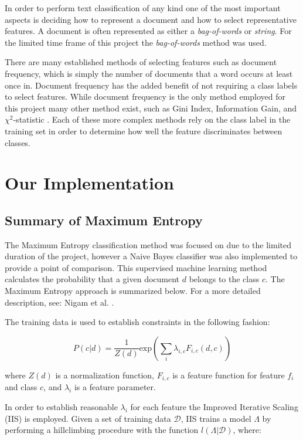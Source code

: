 \documentclass[final,3p,12pt]{elsarticle}
\begin{document}
In order to perform text classification of any kind one of the most important
aspects is deciding how to represent a document and how to select
representative features. A document is often represented as either a
\textit{bag-of-words} or \textit{string}. For the limited time frame of this
project the \textit{bag-of-words} method was used.

There are many established methods of selecting features such as document
frequency, which is simply the number of documents that a word occurs at least
once in. Document frequency has the added benefit of not requiring a class
labels to select features. While document frequency is the only method employed
for this project many other method exist, such as Gini Index, Information Gain,
and $\chi^{2}$-statistic \cite{Aggarwal2012}. Each of these more complex
methods rely on the class label in the training set in order to determine how
well the feature discriminates between classes.

\section{Our Implementation}
\label{section:implementation}

\subsection{Summary of Maximum Entropy}
\label{ssection:summaryofmaxent}

The Maximum Entropy classification method was focused on due to the limited
duration of the project, however a Naive Bayes classifier was also implemented
to provide a point of comparison. This supervised machine learning method
calculates the probability that a given document $d$ belongs to the class $c$.
The Maximum Entropy approach is summarized below. For a more detailed
description, see: Nigam et al. \cite{Nigam1999}.

The training data is used to establish constraints in the following fashion:

\begin{equation}
    P(c | d) = \frac{1}{Z(d)} \mathrm{exp}(\sum\limits_{i} \lambda _{i,c} F_{i,c}(d,c) )
\end{equation}

where $Z(d)$ is a normalization function, $F_{i,c}$ is a feature function for
feature $f_{i}$ and class $c$, and $\lambda_{i}$ is a feature parameter.

In order to establish reasonable $\lambda_{i}$ for each feature the Improved
Iterative Scaling (IIS) is employed. Given a set of training data
$\mathcal{D}$, IIS trains a model $\Lambda$ by performing a hillclimbing
procedure with the function $l(\Lambda|\mathcal{D})$, where:
\end{document}
